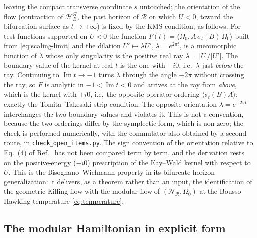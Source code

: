\documentclass[11pt]{article}
\begin{document}
leaving the compact transverse coordinate $s$ untouched; the orientation of the flow (contraction of $\mathcal{H}_B^{\mathcal{R}}$, the past horizon of $\mathcal R$ on which $U<0$, toward the bifurcation surface as $t \to +\infty$) is fixed by the KMS condition, as follows. For test functions supported on $U<0$ the function $F(t)=\langle\Omega_0,A\,\sigma_t(B)\,\Omega_0\rangle$ built from \eqref{eq:scaling-limit} and the dilation $U'\mapsto \lambda U'$, $\lambda=e^{2\pi t}$, is a meromorphic function of $\lambda$ whose only singularity is the positive real ray $\lambda=|U|/|U'|$. The boundary value of the kernel at real $t$ is the one with $-i0$, i.e.\ $\lambda$ just \emph{below} the ray. Continuing to $\operatorname{Im}t\to-1$ turns $\lambda$ through the angle $-2\pi$ without crossing the ray, so $F$ is analytic in $-1<\operatorname{Im}t<0$ and arrives at the ray from \emph{above}, which is the kernel with $+i0$, i.e.\ the opposite operator ordering $\langle\sigma_t(B)A\rangle$: exactly the Tomita--Takesaki strip condition. The opposite orientation $\lambda=e^{-2\pi t}$ interchanges the two boundary values and violates it. This is not a convention, because the two orderings differ by the symplectic form, which is non-zero; the check is performed numerically, with the commutator also obtained by a second route, in \texttt{check\_open\_items.py}. The sign convention of the orientation relative to Eq.~(4) of Ref.~\cite{DorauMuch} has not been compared term by term, and the derivation rests on the positive-energy ($-i0$) prescription of the Kay--Wald kernel with respect to $U$. This is the Bisognano--Wichmann property in its bifurcate-horizon generalization: it delivers, as a theorem rather than an input, the identification of the geometric Killing flow with the modular flow of $(\mathscr{N}_{\mathcal{R}}, \Omega_0)$ at the Bousso--Hawking temperature \eqref{eq:temperature}.

\subsection{The modular Hamiltonian in explicit form}
\label{sec:modularH}
\end{document}
